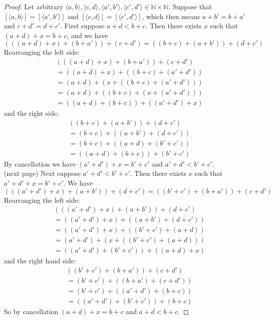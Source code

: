 \documentclass{report}
\begin{document}
\begin{proof}
Let arbitrary $\langle a,b\rangle,\langle c,d\rangle,\langle a',b'\rangle,\langle c',d'\rangle\in\mathbb N\times\mathbb N$. Suppose that 
$[\langle a,b\rangle]=[\langle a',b'\rangle]$ and $[\langle c,d\rangle]=[\langle c',d'\rangle]$, which then means $a+b'=b+a'$ and $c+d'=d+c'$. 
First suppose $a+d<b+c$. Then there exists $x$ such that $(a+d)+x=b+c$, and we have
\begin{equation*}
(((a+d)+x)+(b+a'))+(c+d')=((b+c)+(a+b'))+(d+c')
\end{equation*}
Rearranging the left side:
\begin{align*}
&(((a+d)+x)+(b+a'))+(c+d')\\
&=((a+d)+x)+((b+c)+(a'+d'))\\
&=(a+d)+(x+((b+c)+(a'+d')))\\
&=(a+d)+((b+c)+(x+(a'+d')))\\
&=((a+d)+(b+c))+((a'+d')+x) \end{align*}
and the right side:
\begin{align*}
&((b+c)+(a+b'))+(d+c')\\
&=(b+c)+((a+b')+(d+c'))\\
&=(b+c)+((a+d)+(b'+c'))\\
&=((a+d)+(b+c))+(b'+c')
\end{align*}
By cancellation we have $(a'+d')+x=b'+c'$ and $a'+d'<b'+c'$.\\
(next page)\newpage
Next suppose $a'+d'<b'+c'$. Then there exists $x$ such that $a'+d'+x=b'+c'$. We have
\begin{equation*}
(((a'+d')+x)+(a+b'))+(d+c')=((b'+c')+(b+a'))+(c+d')
\end{equation*}
Rearranging the left side:
\begin{align*}
&(((a'+d')+x)+(a+b'))+(d+c')\\
&=((a'+d')+x)+((a+b')+(d+c'))\\
&=((a'+d')+x)+((b'+c')+(a+d))\\
&=(a'+d')+(x+((b'+c')+(a+d)))\\
&=((a'+d')+(b'+c'))+((a+d)+x)
\end{align*}
and the right hand side:
\begin{align*}
&((b'+c')+(b+a'))+(c+d')\\
&=(b'+c')+((b+a')+(c+d'))\\
&=(b'+c')+((a'+d')+(b+c))\\
&=((a'+d')+(b'+c'))+(b+c)
\end{align*}
So by cancellation $(a+d)+x=b+c$ and $a+d<b+c$.
\end{proof}
\end{document}
